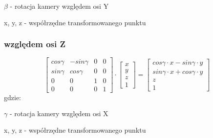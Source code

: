 \documentclass[11pt]{article}
\begin{document}
$\beta$ - rotacja kamery względem osi Y

x, y, z - współrzędne transformowanego punktu

\subsubsection{względem osi Z}
\begin{equation}
    \begin{bmatrix}
        cos \gamma & -sin \gamma & 0 & 0\\
        sin \gamma & cos \gamma & 0 & 0\\
        0 & 0 & 1 & 0\\
        0 & 0 & 0 & 1
    \end{bmatrix}
    \cdot
    \begin{bmatrix}
        x\\
        y\\
        z\\
        1
    \end{bmatrix}
    =
    \begin{bmatrix}
        cos \gamma \cdot x - sin \gamma \cdot y\\
        sin \gamma \cdot x + cos \gamma \cdot y\\
        z\\
        1
    \end{bmatrix}
\end{equation}
gdzie:

$\gamma$ - rotacja kamery względem osi X

x, y, z - współrzędne transformowanego punktu
\end{document}
